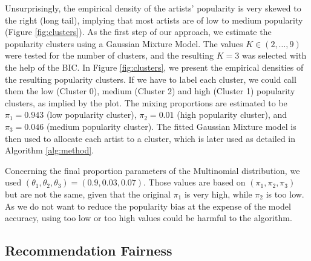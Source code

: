 \documentclass{article}
\begin{document}
Unsurprisingly, the empirical density of the artists' popularity
is very skewed to the right (long tail), 
implying that most artists are of low to medium popularity
(Figure \ref{fig:clusters}). As the first step of our approach, we estimate the popularity clusters 
using a Gaussian Mixture Model. The values $K \in (2, \dots, 9)$ were tested
for the number of clusters, and the resulting 
$K = 3$ was selected with the help of the BIC. In Figure
\ref{fig:clusters}, we present the empirical 
densities of the resulting popularity clusters. If we have to label each
cluster, we could call them the low (Cluster 0), medium (Cluster 2)
and high (Cluster 1) popularity clusters, as implied by the plot. 
The mixing proportions are estimated to be 
$\pi_1 = 0.943$ (low popularity cluster), 
$\pi_2 = 0.01$ (high popularity cluster), 
and  $\pi_3 = 0.046$  (medium popularity cluster). The fitted
Gaussian Mixture model is then used to allocate each artist to a
cluster, which is later used as detailed in Algorithm \ref{alg:method}. 

Concerning the final proportion parameters of the 
Multinomial distribution, we used 
$(\theta_1, \theta_2, \theta_3) = (0.9, 0.03, 0.07)$.
Those values are based on $(\pi_1, \pi_2, \pi_3)$
but are not the same, given that the original
$\pi_1$ is very high, while 
$\pi_2$ is too low. As we do not want 
to reduce the popularity bias at the expense
of the model accuracy, using too low or too
high values could be harmful to the algorithm.



\subsection{Recommendation Fairness}\label{sec:pop_cluster}

\end{document}
